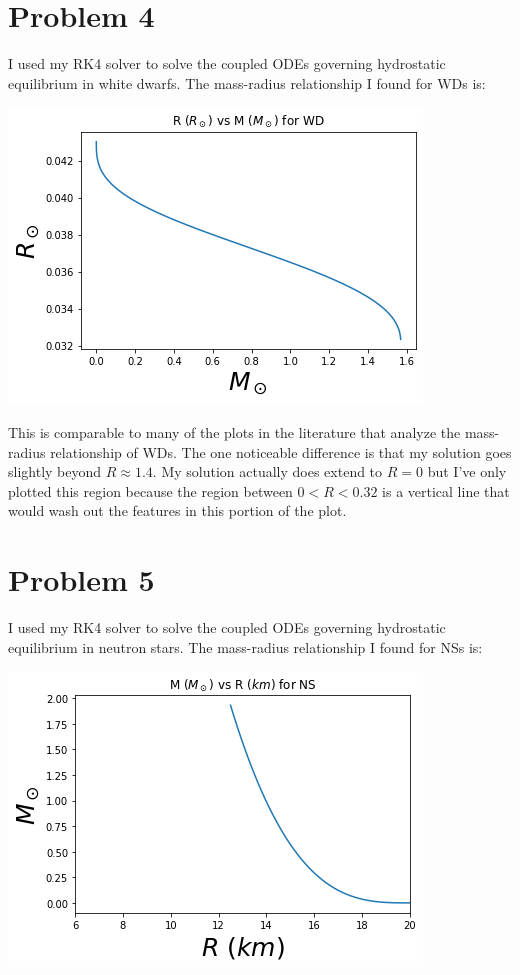\documentclass[12pt, letterpaper]{article}
\begin{document}
\newpage

\section*{Problem 4}
I used my RK4 solver to solve the coupled ODEs governing hydrostatic equilibrium in white dwarfs. The mass-radius relationship I found for WDs is:

\includegraphics{WD_R_vs_M.png}

This is comparable to many of the plots in the literature that analyze the mass-radius relationship of WDs. The one noticeable difference is that my solution goes slightly beyond $ R \approx 1.4$. My solution actually does extend to $R = 0$ but I've only plotted this region because the region between $0 < R < 0.32$ is a vertical line that would wash out the features in this portion of the plot.

\section*{Problem 5}
I used my RK4 solver to solve the coupled ODEs governing hydrostatic equilibrium in neutron stars. The mass-radius relationship I found for NSs
is:

\includegraphics{NS_M_vs_R.png}
\end{document}
